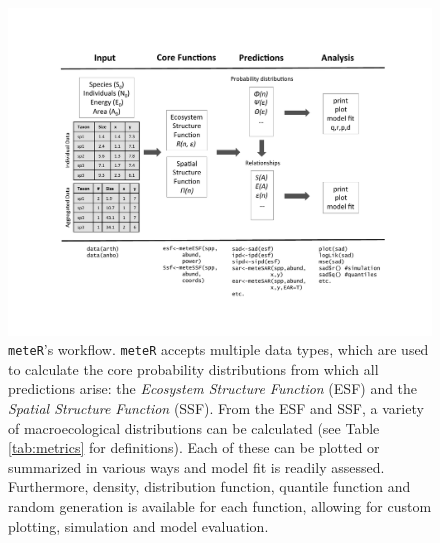 \begin{figure}[!h] 
  \begin{center}
    \includegraphics[width=\textwidth]{figs/meteR_workflow.pdf}
    \caption[\texttt{meteR}'s workflow]{\texttt{meteR}'s
      workflow. \texttt{meteR} accepts multiple data types, which are
      used to calculate the core probability distributions from which
      all predictions arise: the \textit{Ecosystem Structure Function}
      (ESF) and the \textit{Spatial Structure Function} (SSF). From
      the ESF and SSF, a variety of macroecological distributions can
      be calculated (see Table \ref{tab:metrics} for
      definitions). Each of these can be plotted or summarized in
      various ways and model fit is readily assessed. Furthermore,
      density, distribution function, quantile function and random
      generation is available for each function, allowing for custom
      plotting, simulation and model evaluation.}
\label{fig:workflow}
\end{center} 
\end{figure}


